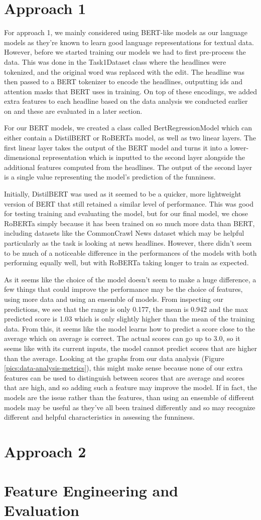 \documentclass[11pt,a4paper]{article}
\begin{document}
\section{Approach 1}
For approach 1, we mainly considered using BERT-like models as our language models as they’re known to learn good language representations for textual data. However, before we started training our models we had to first pre-process the data. This was done in the Task1Dataset class where the headlines were tokenized, and the original word was replaced with the edit. The headline was then passed to a BERT tokenizer to encode the headlines, outputting ids and attention masks that BERT uses in training. On top of these encodings, we added extra features to each headline based on the data analysis we conducted earlier on and these are evaluated in a later section.

For our BERT models, we created a class called BertRegressionModel which can either contain a DistilBERT or RoBERTa model, as well as two linear layers. The first linear layer takes the output of the BERT model and turns it into a lower-dimensional representation which is inputted to the second layer alongside the additional features computed from the headlines. The output of the second layer is a single value representing the model’s prediction of the funniness.

Initially, DistilBERT was used as it seemed to be a quicker, more lightweight version of BERT that still retained a similar level of performance. This was good for testing training and evaluating the model, but for our final model, we chose RoBERTa simply because it has been trained on so much more data than BERT, including datasets like the CommonCrawl News dataset which may be helpful particularly as the task is looking at news headlines. However, there didn’t seem to be much of a noticeable difference in the performances of the models with both performing equally well, but with RoBERTa taking longer to train as expected. 

As it seems like the choice of the model doesn’t seem to make a huge difference, a few things that could improve the performance may be the choice of features, using more data and using an ensemble of models. From inspecting our predictions, we see that the range is only 0.177, the mean is 0.942 and the max predicted score is 1.03 which is only slightly higher than the mean of the training data. From this, it seems like the model learns how to predict a score close to the average which on average is correct. The actual scores can go up to 3.0, so it seems like with its current inputs, the model cannot predict scores that are higher than the average. Looking at the graphs from our data analysis (Figure \ref{pics:data-analysis-metrics}), this might make sense because none of our extra features can be used to distinguish between scores that are average and scores that are high, and so adding such a feature may improve the model. If in fact, the models are the issue rather than the features, than using an ensemble of different models may be useful as they’ve all been trained differently and so may recognize different and helpful characteristics in assessing the funniness.

\section{Approach 2}
\section{Feature Engineering and Evaluation}
\end{document}
